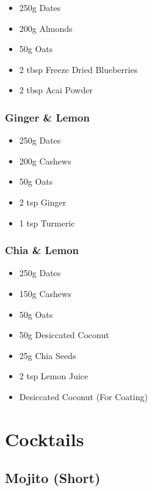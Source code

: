 \documentclass[11pt, english]{article}
\begin{document}
	\begin{itemize}
        \setlength\itemsep{0cm}
                \item 250g Dates
		\item 200g Almonds
		\item 50g Oats
		\item 2 tbsp Freeze Dried Blueberries
		\item 2 tbsp Acai Powder
        \end{itemize}

		\subsubsection*{Ginger \& Lemon}

	\begin{itemize}
        \setlength\itemsep{0cm}
                \item 250g Dates
		\item 200g Cashews
		\item 50g Oats
		\item 2 tsp Ginger
		\item 1 tsp Turmeric
        \end{itemize}

		\subsubsection*{Chia \& Lemon}

	\begin{itemize}
        \setlength\itemsep{0cm}
                \item 250g Dates
		\item 150g Cashews
		\item 50g Oats
		\item 50g Desiccated Coconut
		\item 25g Chia Seeds
		\item 2 tsp Lemon Juice
		\item Desiccated Coconut (For Coating)
        \end{itemize}

\newpage

\section{Cocktails}

	\subsection{Mojito (Short)}
\end{document}
